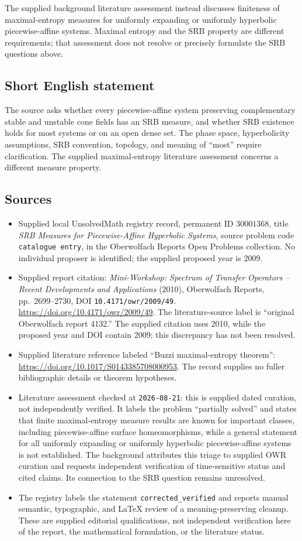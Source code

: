 \documentclass[11pt]{article}
\begin{document}
The supplied background literature assessment instead discusses finiteness of maximal-entropy measures for uniformly expanding or uniformly hyperbolic piecewise-affine systems. Maximal entropy and the SRB property are different requirements; that assessment does not resolve or precisely formulate the SRB questions above.
\subsection{Short English statement}
The source asks whether every piecewise-affine system preserving complementary stable and unstable cone fields has an SRB measure, and whether SRB existence holds for most systems or on an open dense set. The phase space, hyperbolicity assumptions, SRB convention, topology, and meaning of ``most'' require clarification. The supplied maximal-entropy literature assessment concerns a different measure property.
\subsection{Sources}
\begin{itemize}
\item Supplied local UnsolvedMath registry record, permanent ID \(30001368\), title \emph{SRB Measures for Piecewise-Affine Hyperbolic Systems}, source problem code \texttt{catalogue entry}, in the Oberwolfach Reports Open Problems collection. No individual proposer is identified; the supplied proposed year is 2009.
\item Supplied report citation: \emph{Mini-Workshop: Spectrum of Transfer Operators -- Recent Developments and Applications} (2010), Oberwolfach Reports, pp.\ 2699--2730, DOI \texttt{10.4171/owr/2009/49}. \url{https://doi.org/10.4171/owr/2009/49}. The literature-source label is ``original Oberwolfach report 4132.'' The supplied citation uses 2010, while the proposed year and DOI contain 2009; this discrepancy has not been resolved.
\item Supplied literature reference labeled ``Buzzi maximal-entropy theorem'': \url{https://doi.org/10.1017/S0143385708000953}. The record supplies no fuller bibliographic details or theorem hypotheses.
\item Literature assessment checked at \texttt{2026-08-21}: this is supplied dated curation, not independently verified. It labels the problem ``partially solved'' and states that finite maximal-entropy measure results are known for important classes, including piecewise-affine surface homeomorphisms, while a general statement for all uniformly expanding or uniformly hyperbolic piecewise-affine systems is not established. The background attributes this triage to supplied OWR curation and requests independent verification of time-sensitive status and cited claims. Its connection to the SRB question remains unresolved.
\item The registry labels the statement \texttt{corrected\_verified} and reports manual semantic, typographic, and LaTeX review of a meaning-preserving cleanup. These are supplied editorial qualifications, not independent verification here of the report, the mathematical formulation, or the literature status.
\end{itemize}
\end{document}
